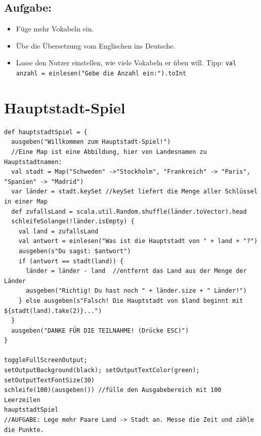 \section*{\color{BrickRed}Aufgabe:}


\begin{itemize}

\item {Füge mehr Vokabeln ein.}
\item {Übe die Übersetzung vom Englischen ins Deutsche.}
\item {Lasse den Nutzer einstellen, wie viele Vokabeln er üben will. Tipp: \lstinline{val anzahl = einlesen("Gebe die Anzahl ein:").toInt}}

\end{itemize}


\chapter{Hauptstadt-Spiel}
\begin{lstlisting}[basicstyle={\ttfamily\fontsize{13}{16}\selectfont},numbers=none]
def hauptstadtSpiel = {
  ausgeben("Willkommen zum Hauptstadt-Spiel!")
  //Eine Map ist eine Abbildung, hier von Landesnamen zu Hauptstadtnamen:
  val stadt = Map("Schweden" ->"Stockholm", "Frankreich" -> "Paris", "Spanien" -> "Madrid")
  var länder = stadt.keySet //keySet liefert die Menge aller Schlüssel in einer Map 
  def zufallsLand = scala.util.Random.shuffle(länder.toVector).head
  schleifeSolange(!länder.isEmpty) {
    val land = zufallsLand
    val antwort = einlesen("Was ist die Hauptstadt von " + land + "?")
    ausgeben(s"Du sagst: $antwort")
    if (antwort == stadt(land)) {
      länder = länder - land  //entfernt das Land aus der Menge der Länder
      ausgeben("Richtig! Du hast noch " + länder.size + " Länder!")
    } else ausgeben(s"Falsch! Die Hauptstadt von $land beginnt mit ${stadt(land).take(2)}...")
  }
  ausgeben("DANKE FÜR DIE TEILNAHME! (Drücke ESC)")
}

toggleFullScreenOutput;  
setOutputBackground(black); setOutputTextColor(green); setOutputTextFontSize(30)
schleife(100)(ausgeben()) //fülle den Ausgabebereich mit 100 Leerzeilen
hauptstadtSpiel
//AUFGABE: Lege mehr Paare Land -> Stadt an. Messe die Zeit und zähle die Punkte.
\end{lstlisting}
        
